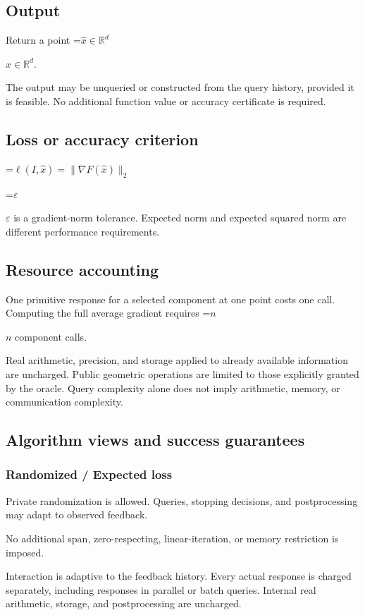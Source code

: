 \documentclass[10pt,a4paper]{article}
\newcommand{\AtlasMath}[1]{\par\begingroup\centering\setbox0=\hbox{$\displaystyle #1$}\ifdim\wd0>1.4\linewidth\typeout{ATLAS WIDE FORMULA: \the\wd0}\fi\ifdim\wd0>\linewidth\resizebox{\linewidth}{!}{\box0}\else\box0\fi\par\endgroup}
\newcommand{\AtlasInlineMath}[1]{\begingroup\setbox0=\hbox{$#1$}\ifdim\wd0>.4\linewidth\endgroup\AtlasMath{#1}\else\endgroup$#1$\fi}
\begin{document}
\subsection{Output}
Return a point \AtlasInlineMath{\widehat x\in\mathbb R^d}.

The output may be unqueried or constructed from the query history, provided it is feasible. No additional function value or accuracy certificate is required.

\subsection{Loss or accuracy criterion}

\AtlasMath{\ell(I,\widehat{x})=\|\nabla F(\widehat{x})\|_2}


\AtlasInlineMath{\varepsilon} is a gradient-norm tolerance. Expected norm and expected squared norm are different performance requirements.

\subsection{Resource accounting}
One primitive response for a selected component at one point costs one call. Computing the full average gradient requires \AtlasInlineMath{n} component calls.

Real arithmetic, precision, and storage applied to already available information are uncharged. Public geometric operations are limited to those explicitly granted by the oracle. Query complexity alone does not imply arithmetic, memory, or communication complexity.

\subsection{Algorithm views and success guarantees}
\subsubsection{Randomized / Expected loss}
Private randomization is allowed. Queries, stopping decisions, and postprocessing may adapt to observed feedback.

No additional span, zero-respecting, linear-iteration, or memory restriction is imposed.

Interaction is adaptive to the feedback history. Every actual response is charged separately, including responses in parallel or batch queries. Internal real arithmetic, storage, and postprocessing are uncharged.
\end{document}

